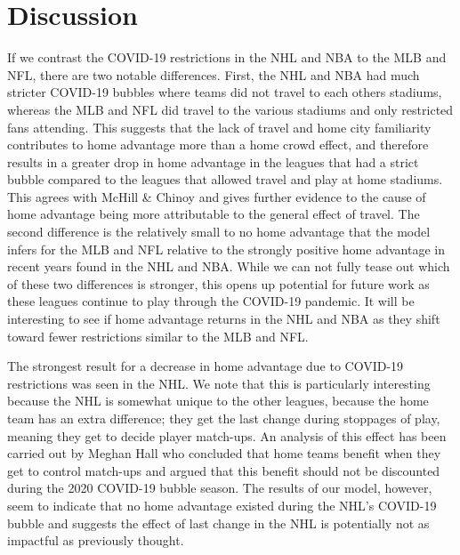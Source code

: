 \section*{Discussion}


If we contrast the COVID-19 restrictions in the NHL and NBA to the MLB and NFL, there are two notable differences. First, the NHL and NBA had much stricter COVID-19 bubbles where teams did not travel to each others stadiums, whereas the MLB and NFL did travel to the various stadiums and only restricted fans attending. This suggests that the lack of travel and home city familiarity contributes to home advantage more than a home crowd effect, and therefore results in a greater drop in home advantage in the leagues that had a strict bubble compared to the leagues that allowed travel and play at home stadiums. This agrees with McHill \& Chinoy \cite{McHill2020} and gives further evidence to the cause of home advantage being more attributable to the general effect of travel. The second difference is the relatively small to no home advantage that the model infers for the MLB and NFL relative to the strongly positive home advantage in recent years found in the NHL and NBA. While we can not fully tease out which of these two differences is stronger, this opens up potential for future work as these leagues continue to play through the COVID-19 pandemic. It will be interesting to see if home advantage returns in the NHL and NBA as they shift toward fewer restrictions similar to the MLB and NFL.

The strongest result for a decrease in home advantage due to COVID-19 restrictions was seen in the NHL. We note that this is particularly interesting because the NHL is somewhat unique to the other leagues, because the home team has an extra difference; they get the last change during stoppages of play, meaning they get to decide player match-ups. An analysis of this effect has been carried out by Meghan Hall \cite{Hall2020} who concluded that home teams benefit when they get to control match-ups and argued that this benefit should not be discounted during the 2020 COVID-19 bubble season. The results of our model, however, seem to indicate that no home advantage existed during the NHL's COVID-19 bubble and suggests the effect of last change in the NHL is potentially not as impactful as previously thought.

